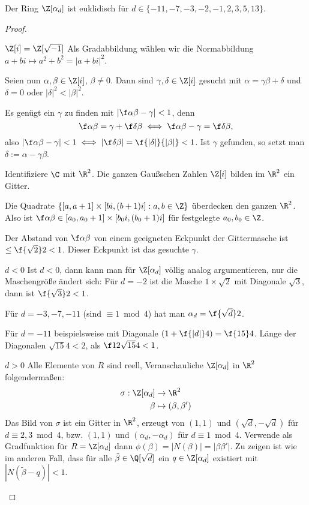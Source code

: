 \begin{st} \label{4.9}
	Der Ring $\Z[\alpha_d]$ ist euklidisch für $d \in \{-11, -7, -3, -2, -1, 2, 3, 5, 13\}$.
	\begin{proof}
		\begin{segnb}{$\Z[i] = \Z[\sqrt{-1}]$}
			Als Gradabbildung wählen wir die Normabbildung $a + bi \mapsto a^2 + b^2 = |a + bi|^2$.

			Seien nun $\alpha, \beta \in \Z[i]$, $\beta \neq 0$.
			Dann sind $\gamma, \delta \in \Z[i]$ gesucht mit $\alpha = \gamma \beta + \delta$ und $\delta = 0$ oder $|\delta|^2 < |\beta|^2$.

			Es genügt ein $\gamma$ zu finden mit $| \f \alpha\beta - \gamma | < 1$, denn
			\[
				\f \alpha\beta = \gamma + \f \delta\beta
				\iff \f \alpha\beta - \gamma = \f \delta \beta,
			\]
			also $| \f \alpha \beta - \gamma | < 1 \iff |\f \delta \beta| = \f {|\delta|}{|\beta|} < 1$.
			Ist $\gamma$ gefunden, so setzt man $\delta := \alpha - \gamma \beta$.

			Identifiziere $\C$ mit $\R^2$.
			Die ganzen Gaußschen Zahlen $\Z[i]$ bilden im $\R^2$ ein Gitter.

			Die Quadrate $\{[a, a+1] \times [bi, (b+1)i]: a,b \in \Z\}$ überdecken den ganzen $\R^2$.
			Also ist $\f \alpha\beta \in [a_0, a_0 + 1] \times [b_0 i, (b_0+1)i]$ für festgelegte $a_0, b_0 \in \Z$.

			Der Abstand von $\f \alpha\beta$ von einem geeigneten Eckpunkt der Gittermasche ist $\le \f{\sqrt 2}2 < 1$.
			Dieser Eckpunkt ist das gesuchte $\gamma$.
		\end{segnb}
		\begin{segnb}{$d < 0$}
			Ist $d < 0$, dann kann man für $\Z[\alpha_d]$ völlig analog argumentieren, nur die Maschengröße ändert sich:
			Für $d = -2$ ist die Masche $1 \times \sqrt 2$ mit Diagonale $\sqrt 3$, dann ist $\f {\sqrt 3}2 < 1$.

			Für $d = -3, -7, -11$ (sind $\equiv 1 \bmod 4$) hat man $\alpha_d = \f {\sqrt{d}}2$.


			Für $d = -11$ beispielsweise mit Diagonale $(1 + \f {|d|}4) = \f {15}4$.
			Länge der Diagonalen $\sqrt{15}{4} < 2$, als $\f 12 \sqrt{15}{4} < 1$.
		\end{segnb}
		\begin{segnb}{$d > 0$}
			Alle Elemente von $R$ sind reell, Veranschauliche $\Z[\alpha_d]$ in $\R^2$ folgendermaßen:
			\begin{align*}
				\sigma: \Z[\alpha_d] &\to \R^2 \\
				\beta &\mapsto (\beta, \beta')
			\end{align*}
			Das Bild von $\sigma$ ist ein Gitter in $\R^2$, erzeugt von $(1,1)$ und $(\sqrt d, -\sqrt d)$ für $d \equiv 2,3 \bmod 4$, bzw. $(1,1)$ und $(\alpha_d, -\alpha_d)$ für $d \equiv 1 \bmod 4$.
			Verwende als Gradfunktion für $R = \Z[\alpha_d]$ dann $\phi(\beta) = |N(\beta)| = |\beta \beta'|$.
			Zu zeigen ist wie im anderen Fall, dass für alle $\tilde \beta \in \Q[\sqrt d]$ ein $q \in \Z[\alpha_d]$ existiert mit $|N(\tilde \beta - q)| < 1$.


\end{segnb}
\end{proof}
\end{st}
